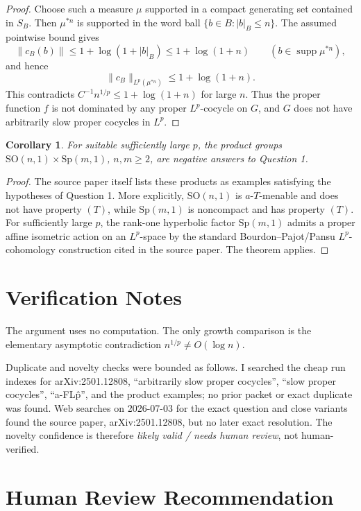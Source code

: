 \documentclass[11pt]{article}
\newtheorem{corollary}{Corollary}
\begin{document}
\begin{proof}
Choose such a measure \(\mu\) supported in a compact generating set contained
in \(S_B\). Then \(\mu^{*n}\) is supported in the word ball
\(\{b\in B: |b|_B\leq n\}\). The assumed pointwise bound gives
\[
  \|c_B(b)\|\leq 1+\log(1+|b|_B)\leq 1+\log(1+n)
  \qquad (b\in \operatorname{supp}\mu^{*n}),
\]
and hence
\[
  \|c_B\|_{L^p(\mu^{*n})}\leq 1+\log(1+n).
\]
This contradicts \(C^{-1}n^{1/p}\leq 1+\log(1+n)\) for large \(n\). Thus
the proper function \(f\) is not dominated by any proper \(L^p\)-cocycle on
\(G\), and \(G\) does not have arbitrarily slow proper cocycles in \(L^p\).
\end{proof}

\begin{corollary}
For suitable sufficiently large \(p\), the product groups
\(\mathrm{SO}(n,1)\times \mathrm{Sp}(m,1)\), \(n,m\geq 2\), are negative
answers to Question 1.
\end{corollary}

\begin{proof}
The source paper itself lists these products as examples satisfying the
hypotheses of Question 1. More explicitly, \(\mathrm{SO}(n,1)\) is
\(a\)-\(T\)-menable and does not have property \((T)\), while
\(\mathrm{Sp}(m,1)\) is noncompact and has property \((T)\). For sufficiently
large \(p\), the rank-one hyperbolic factor \(\mathrm{Sp}(m,1)\) admits a
proper affine isometric action on an \(L^p\)-space by the standard
Bourdon--Pajot/Pansu \(L^p\)-cohomology construction cited in the source
paper. The theorem applies.
\end{proof}

\section*{Verification Notes}

The argument uses no computation. The only growth comparison is the elementary
asymptotic contradiction \(n^{1/p}\not=O(\log n)\).

Duplicate and novelty checks were bounded as follows. I searched the cheap run
indexes for arXiv:2501.12808, ``arbitrarily slow proper cocycles'',
``slow proper cocycles'', ``a-FL\^p'', and the product examples; no prior
packet or exact duplicate was found. Web searches on 2026-07-03 for the exact
question and close variants found the source paper, arXiv:2501.12808, but no
later exact resolution. The novelty confidence is therefore
\emph{likely valid / needs human review}, not human-verified.

\section*{Human Review Recommendation}
\end{document}
